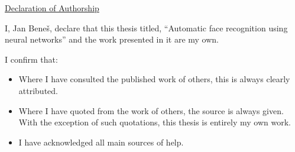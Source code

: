 \vspace*{20pt}
\begin{center}
    \underline{Declaration of Authorship}
\end{center}

I, Jan Beneš, declare that this thesis titled, “Automatic face recognition using neural networks” and the work 
presented in it are my own.

I confirm that:
\begin{itemize}
    \item Where I have consulted the published work of others, this is always clearly attributed.
    \item Where I have quoted from the work of others, the source is always given.
    With the exception of such quotations, this thesis is entirely my own work.
    \item I have acknowledged all main sources of help.
\end{itemize}